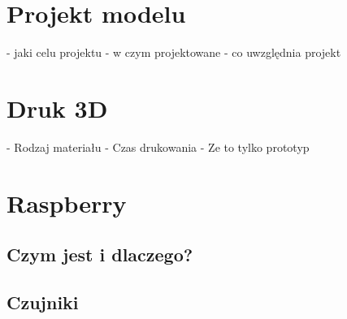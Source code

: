 \section{Projekt modelu}
- jaki celu projektu
- w czym projektowane
- co uwzględnia projekt

\section{Druk 3D}
- Rodzaj materiału
- Czas drukowania
- Ze to tylko prototyp

\section{Raspberry}

\subsection{Czym jest i dlaczego?}

\subsection{Czujniki}
